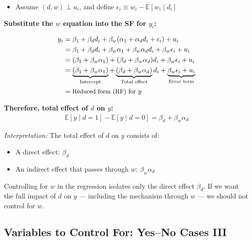 \documentclass[12pt]{article}
\begin{document}
\begin{itemize}
    \item Assume $(d, w) \perp u_i$, and define $\epsilon_i \equiv w_i - \mathbb{E}[w_i \mid d_i]$
\end{itemize}

\vspace{1em}
\textbf{Substitute the $w$ equation into the SF for $y_i$:}

\begin{align}
y_i &= \beta_1 + \beta_d d_i + \beta_w(\alpha_1 + \alpha_d d_i + \epsilon_i) + u_i \\
    &= \beta_1 + \beta_d d_i + \beta_w \alpha_1 + \beta_w \alpha_d d_i + \beta_w \epsilon_i + u_i \\
    &= (\beta_1 + \beta_w \alpha_1) + (\beta_d + \beta_w \alpha_d) d_i + \beta_w \epsilon_i + u_i \\
    &= \underbrace{(\beta_1 + \beta_w \alpha_1)}_{\text{Intercept}} + \underbrace{(\beta_d + \beta_w \alpha_d)}_{\text{Total effect}} d_i + \underbrace{\beta_w \epsilon_i + u_i}_{\text{Error term}} \\
    &= \text{\small Reduced form (RF) for } y
\end{align}

\vspace{1em}
\textbf{Therefore, total effect of $d$ on $y$:}
\begin{align}
\mathbb{E}[y \mid d = 1] - \mathbb{E}[y \mid d = 0] = \beta_d + \beta_w \alpha_d
\end{align}

\textit{Interpretation:}  
The total effect of $d$ on $y$ consists of:
\begin{itemize}
    \item A direct effect: $\beta_d$
    \item An indirect effect that passes through $w$: $\beta_w \alpha_d$
\end{itemize}

Controlling for $w$ in the regression isolates only the direct effect $\beta_d$.  
If we want the full impact of $d$ on $y$ — including the mechanism through $w$ — we should not control for $w$.

\subsection*{\noindent\textbf{Variables to Control For: Yes–No Cases III}}
\end{document}
